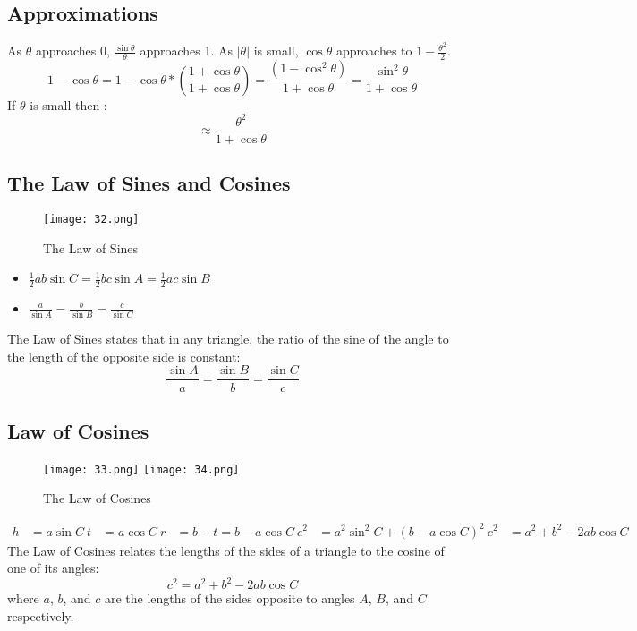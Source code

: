 \subsection{Approximations}
As $ \theta $ approaches 0, $ \frac{\sin \theta}{\theta} $ approaches 1.
As $ |\theta| $ is small, $ \cos \theta $ approaches to  $1 - \frac{\theta^2}{2} $.
\begin{displaymath}
    1 - \cos \theta = 1 - \cos \theta * (\frac{1 + \cos \theta}{1 + \cos \theta}) = \frac{(1 - \cos^2 \theta)}{1 + \cos \theta} = \frac{\sin^2 \theta}{1 + \cos \theta}
\end{displaymath}
If $ \theta$ is small then :
\begin{displaymath}
  \approx  \frac{\theta ^{2}}{1+ \cos \theta}
\end{displaymath}

\subsection{The Law of Sines and Cosines}
\begin{figure}
    \centering
    \texttt{[image: 32.png]}
    \caption{The Law of Sines}
\end{figure}
\begin{itemize}
    \item $ \frac{1}{2} ab \sin C = \frac{1}{2}bc\sin A = \frac{1}{2}ac\sin B$
    \item $ \frac{a}{\sin A} = \frac{b}{\sin B} = \frac{c}{\sin C}$
\end{itemize}
The Law of Sines states that in any triangle, the ratio of the sine of the angle to the length of the opposite side is constant:
\[ \frac{\sin A}{a} = \frac{\sin B}{b} = \frac{\sin C}{c} \]

\subsection{Law of Cosines}
\begin{figure}
    \centering
    \texttt{[image: 33.png]}
    \texttt{[image: 34.png]}
    \caption{The Law of Cosines}
\end{figure}
\begin{align}
    h &= a\sin C\
    t &= a \cos C \
    r &= b - t = b - a \cos C \
    c^2  &= a^2 \sin^2 C + (b - a \cos C)^2 \
    c^2 &= a^2 + b^2 - 2ab \cos C
\end{align}
The Law of Cosines relates the lengths of the sides of a triangle to the cosine of one of its angles:
\[ c^2 = a^2 + b^2 - 2ab \cos C \]
where $a$, $b$, and $c$ are the lengths of the sides opposite to angles $A$, $B$, and $C$ respectively.

